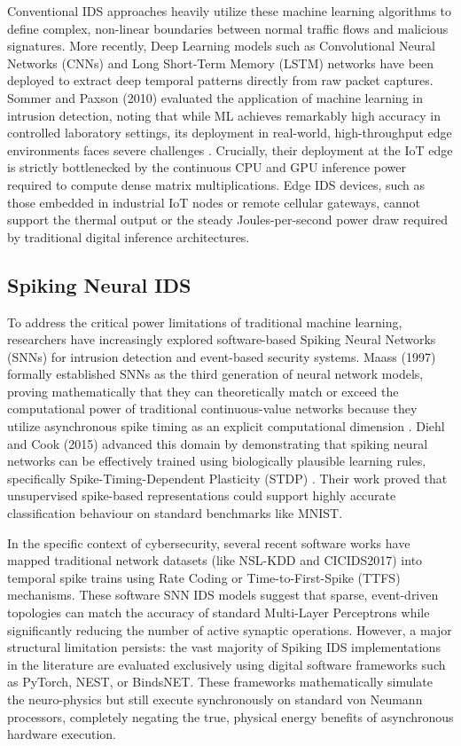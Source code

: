 \documentclass{ieeeaccess}
\begin{document}
Conventional IDS approaches heavily utilize these machine learning algorithms to define complex, non-linear boundaries between normal traffic flows and malicious signatures. More recently, Deep Learning models such as Convolutional Neural Networks (CNNs) and Long Short-Term Memory (LSTM) networks have been deployed to extract deep temporal patterns directly from raw packet captures. Sommer and Paxson (2010) evaluated the application of machine learning in intrusion detection, noting that while ML achieves remarkably high accuracy in controlled laboratory settings, its deployment in real-world, high-throughput edge environments faces severe challenges \cite{Sommer2010}. Crucially, their deployment at the IoT edge is strictly bottlenecked by the continuous CPU and GPU inference power required to compute dense matrix multiplications. Edge IDS devices, such as those embedded in industrial IoT nodes or remote cellular gateways, cannot support the thermal output or the steady Joules-per-second power draw required by traditional digital inference architectures.

\subsection{Spiking Neural IDS}
To address the critical power limitations of traditional machine learning, researchers have increasingly explored software-based Spiking Neural Networks (SNNs) for intrusion detection and event-based security systems. Maass (1997) formally established SNNs as the third generation of neural network models, proving mathematically that they can theoretically match or exceed the computational power of traditional continuous-value networks because they utilize asynchronous spike timing as an explicit computational dimension \cite{Maass1997}. Diehl and Cook (2015) advanced this domain by demonstrating that spiking neural networks can be effectively trained using biologically plausible learning rules, specifically Spike-Timing-Dependent Plasticity (STDP) \cite{Diehl2015}. Their work proved that unsupervised spike-based representations could support highly accurate classification behaviour on standard benchmarks like MNIST.

In the specific context of cybersecurity, several recent software works have mapped traditional network datasets (like NSL-KDD and CICIDS2017) into temporal spike trains using Rate Coding or Time-to-First-Spike (TTFS) mechanisms. These software SNN IDS models suggest that sparse, event-driven topologies can match the accuracy of standard Multi-Layer Perceptrons while significantly reducing the number of active synaptic operations. However, a major structural limitation persists: the vast majority of Spiking IDS implementations in the literature are evaluated exclusively using digital software frameworks such as PyTorch, NEST, or BindsNET. These frameworks mathematically simulate the neuro-physics but still execute synchronously on standard von Neumann processors, completely negating the true, physical energy benefits of asynchronous hardware execution.
\end{document}
